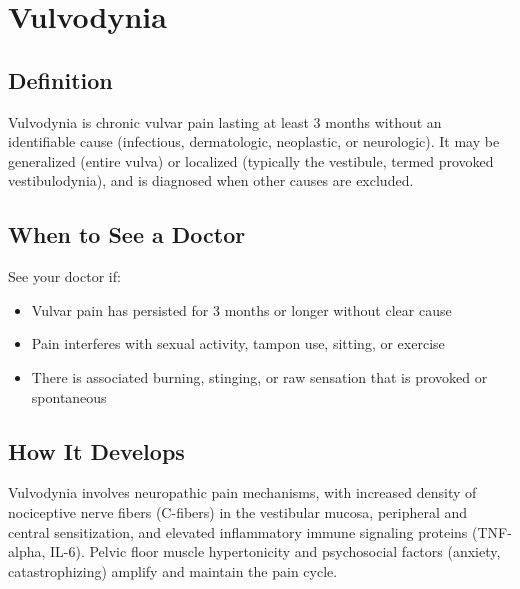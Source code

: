 \chapter{Vulvodynia}

\section*{Definition}
Vulvodynia is chronic vulvar pain lasting at least 3 months without an identifiable cause (infectious, dermatologic, neoplastic, or neurologic). It may be generalized (entire vulva) or localized (typically the vestibule, termed provoked vestibulodynia), and is diagnosed when other causes are excluded.

\section*{When to See a Doctor}
See your doctor if:
\begin{itemize}
  \item Vulvar pain has persisted for 3 months or longer without clear cause
  \item Pain interferes with sexual activity, tampon use, sitting, or exercise
  \item There is associated burning, stinging, or raw sensation that is provoked or spontaneous
\end{itemize}

\section*{How It Develops}
Vulvodynia involves neuropathic pain mechanisms, with increased density of nociceptive nerve fibers (C-fibers) in the vestibular mucosa, peripheral and central sensitization, and elevated inflammatory immune signaling proteins (TNF-alpha, IL-6). Pelvic floor muscle hypertonicity and psychosocial factors (anxiety, catastrophizing) amplify and maintain the pain cycle.

